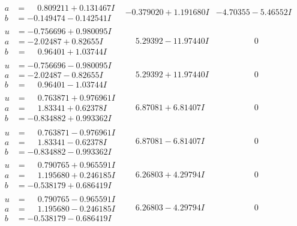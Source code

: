 \documentclass[1p]{elsarticle_modified}
\theoremstyle{definition}
\begin{document}
$$\begin{array}{c|c|c}
\begin{aligned}
a &= \phantom{-}0.809211 + 0.131467 I \\
b &= -0.149474 - 0.142541 I\end{aligned}
 & -0.379020 + 1.191680 I & -4.70355 - 5.46552 I \\ \hline\begin{aligned}
u &= -0.756696 + 0.980095 I \\
a &= -2.02487 + 0.82655 I \\
b &= \phantom{-}0.96401 + 1.03744 I\end{aligned}
 & \phantom{-}5.29392 - 11.97440 I & \phantom{-0.000000 } 0 \\ \hline\begin{aligned}
u &= -0.756696 - 0.980095 I \\
a &= -2.02487 - 0.82655 I \\
b &= \phantom{-}0.96401 - 1.03744 I\end{aligned}
 & \phantom{-}5.29392 + 11.97440 I & \phantom{-0.000000 } 0 \\ \hline\begin{aligned}
u &= \phantom{-}0.763871 + 0.976961 I \\
a &= \phantom{-}1.83341 + 0.62378 I \\
b &= -0.834882 + 0.993362 I\end{aligned}
 & \phantom{-}6.87081 + 6.81407 I & \phantom{-0.000000 } 0 \\ \hline\begin{aligned}
u &= \phantom{-}0.763871 - 0.976961 I \\
a &= \phantom{-}1.83341 - 0.62378 I \\
b &= -0.834882 - 0.993362 I\end{aligned}
 & \phantom{-}6.87081 - 6.81407 I & \phantom{-0.000000 } 0 \\ \hline\begin{aligned}
u &= \phantom{-}0.790765 + 0.965591 I \\
a &= \phantom{-}1.195680 + 0.246185 I \\
b &= -0.538179 + 0.686419 I\end{aligned}
 & \phantom{-}6.26803 + 4.29794 I & \phantom{-0.000000 } 0 \\ \hline\begin{aligned}
u &= \phantom{-}0.790765 - 0.965591 I \\
a &= \phantom{-}1.195680 - 0.246185 I \\
b &= -0.538179 - 0.686419 I\end{aligned}
 & \phantom{-}6.26803 - 4.29794 I & \phantom{-0.000000 } 0 \\ \hline\begin{aligned}

\end{aligned}
\end{array}$$
\end{document}
